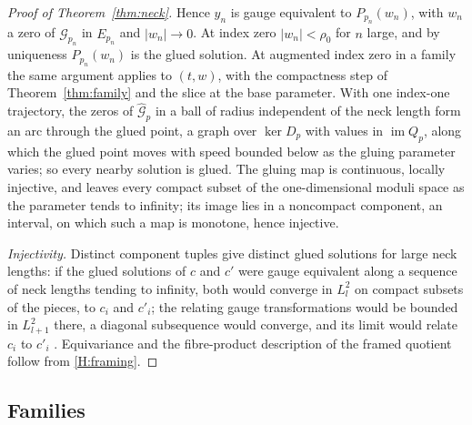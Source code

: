 \documentclass[11pt]{amsart}
\theoremstyle{definition}
\theoremstyle{remark}
\theoremstyle{plain}
\numberwithin{equation}{section}
\newcommand{\im}{\operatorname{im}}
\begin{document}
\begin{proof}[Proof of Theorem~\ref{thm:neck}]
Hence $y_n$ is gauge equivalent to $P_{p_n}(w_n)$, with $w_n$ a zero of
$\widehat{\mathcal G}_{p_n}$ in $E_{p_n}$ and $|w_n|\to0$. At index zero $|w_n|<\rho_0$ for $n$
large, and by uniqueness $P_{p_n}(w_n)$ is the glued solution. At augmented index zero in a
family the same argument applies to $(t,w)$, with the compactness step of
Theorem~\ref{thm:family} and the slice at the base parameter. With one index-one trajectory, the
zeros of $\widehat{\mathcal G}_p$ in a ball of radius independent of the neck length form an arc
through the glued point, a graph over $\ker D_p$ with values in $\im Q_p$, along which the glued
point moves with speed bounded below as the gluing parameter varies; so every nearby solution is
glued. The gluing map is continuous, locally injective, and leaves every compact subset of the
one-dimensional moduli space as the parameter tends to infinity; its image lies in a noncompact
component, an interval, on which such a map is monotone, hence injective.

\emph{Injectivity.} Distinct component tuples give distinct glued solutions for large neck
lengths: if the glued solutions of $c$ and $c'$ were gauge equivalent along a sequence of neck
lengths tending to infinity, both would converge in $L^2_l$ on compact subsets of the pieces, to
$c_i$ and $c'_i$; the relating gauge transformations would be bounded in $L^2_{l+1}$ there, a
diagonal subsequence would converge, and its limit would relate $c_i$ to $c'_i$
\cite[Section~4.4]{Donaldson-book}. Equivariance and the fibre-product description of the framed
quotient follow from \ref{H:framing}.
\end{proof}

\subsection{Families}
\end{document}
